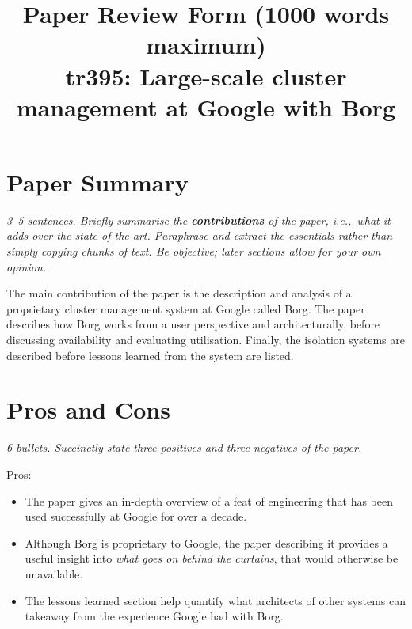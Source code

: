 \documentclass[11pt]{article}
\begin{document}

\title{Paper Review Form (1000 words maximum)\\
    tr395: Large-scale cluster management at Google with Borg \cite{Borg}}

\maketitle

\section*{Paper Summary}

\textsl{3--5 sentences. Briefly summarise the {\bf contributions} of the paper,
i.e.,~what it adds over the state of the art. Paraphrase and extract the
essentials rather than simply copying chunks of text. Be objective; later
sections allow for your own opinion.}

The main contribution of the paper is the description and analysis of a
proprietary cluster management system at Google called Borg. The paper
describes how Borg works from a user perspective and architecturally, before
discussing availability and evaluating utilisation. Finally, the isolation
systems are described before lessons learned from the system are listed.

\section*{Pros and Cons}

\textsl{6 bullets. Succinctly state three positives and three negatives of the
paper.}

Pros:

\begin{itemize}

    \item The paper gives an in-depth overview of a feat of engineering that has
    been used successfully at Google for over a decade.

    \item Although Borg is proprietary to Google, the paper describing it
    provides a useful insight into \textit{what goes on behind the curtains},
    that would otherwise be unavailable.

    \item The lessons learned section help quantify what architects of other
    systems can takeaway from the experience Google had with Borg.

\end{itemize}
\end{document}
